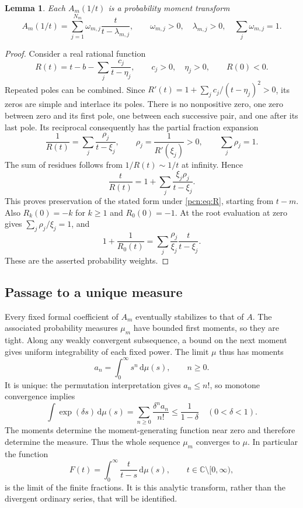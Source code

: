 \documentclass[11pt,letterpaper]{article}
\newtheorem{lemma}[theorem]{Lemma}
\theoremstyle{remark}\newtheorem{remark}[theorem]{Remark}
\newcommand{\dd}{\,\mathrm d}
\newcommand{\C}{\mathbb C}
\begin{document}
\begin{lemma}\label{pcn:lem:finite}
Each $A_m(1/t)$ is a probability moment transform
\[
 A_m(1/t)=\sum_{j=1}^{N_m}\omega_{m,j}\frac{t}{t-\lambda_{m,j}},
 \qquad \omega_{m,j}>0,\quad\lambda_{m,j}>0,\quad
 \sum_j\omega_{m,j}=1.
\]
\end{lemma}
\begin{proof}
Consider a real rational function
\[
 R(t)=t-b-\sum_j\frac{c_j}{t-\eta_j},\qquad c_j>0,\quad\eta_j>0,
 \qquad R(0)<0.
\]
Repeated poles can be combined. Since $R'(t)=1+\sum_j c_j/(t-\eta_j)^2>0$, its zeros are simple and interlace its poles. There is no nonpositive zero, one zero between zero and its first pole, one between each successive pair, and one after its last pole. Its reciprocal consequently has the partial fraction expansion
\[
 \frac1{R(t)}=\sum_j\frac{\rho_j}{t-\xi_j},\qquad
 \rho_j=\frac1{R'(\xi_j)}>0,\qquad \sum_j\rho_j=1.
\]
The sum of residues follows from $1/R(t)\sim1/t$ at infinity. Hence
\[
 \frac{t}{R(t)}=1+\sum_j\frac{\xi_j\rho_j}{t-\xi_j}.
\]
This proves preservation of the stated form under \eqref{pcn:eq:R}, starting from $t-m$. Also $R_k(0)=-k$ for $k\ge1$ and $R_0(0)=-1$. At the root evaluation at zero gives $\sum_j\rho_j/\xi_j=1$, and
\[
 1+\frac1{R_0(t)}=\sum_j\frac{\rho_j}{\xi_j}\frac{t}{t-\xi_j}.
\]
These are the asserted probability weights.
\end{proof}

\subsection{Passage to a unique measure}\label{pcn:sec:moments}
Every fixed formal coefficient of $A_m$ eventually stabilizes to that of $A$. The associated probability measures $\mu_m$ have bounded first moments, so they are tight. Along any weakly convergent subsequence, a bound on the next moment gives uniform integrability of each fixed power. The limit $\mu$ thus has moments
\begin{equation}\label{pcn:eq:moments}
 a_n=\int_0^\infty s^n\dd\mu(s),\qquad n\ge0.
\end{equation}
It is unique: the permutation interpretation gives $a_n\le n!$, so monotone convergence implies
\[
 \int\exp(\delta s)\dd\mu(s)
   =\sum_{n\ge0}\frac{\delta^na_n}{n!}\le\frac1{1-\delta}
       \quad(0<\delta<1).
\]
The moments determine the moment-generating function near zero and therefore determine the measure. Thus the whole sequence $\mu_m$ converges to $\mu$. In particular the function
\begin{equation}\label{pcn:eq:Fmeasure}
 F(t)=\int_0^\infty\frac{t}{t-s}\dd\mu(s),\qquad
 t\in\C\setminus[0,\infty),
\end{equation}
is the limit of the finite fractions. It is this analytic transform, rather than the divergent ordinary series, that will be identified.
\end{document}
